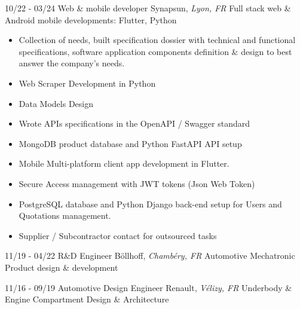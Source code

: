 \documentclass[]{friggeri-cv}
\begin{document}
\begin{entrylist}
  \entry
    {10/22 - 03/24}
    {Web \& mobile developer}
    {Synapsun, \textit{Lyon, FR}}
    {Full stack web \& Android mobile developments: \hspace*{8mm}Flutter, Python}
\end{entrylist}
\vspace{-15pt}

\vspace{0.5mm}
\begin{itemize}
\setlength{\itemsep}{1pt}
\setlength{\parskip}{0pt}
\setlength{\parsep}{0pt}

\item Collection of needs, built specification dossier with technical and functional specifications, software application components definition \& design to best answer the company's needs.
\item Web Scraper Development in Python
\item Data Models Design
\item Wrote APIs specifications in the OpenAPI / Swagger standard
\item MongoDB product database and Python FastAPI API setup
\item Mobile Multi-platform client app development in Flutter.
\item Secure Access management with JWT tokens (Json Web Token)
\item PostgreSQL database and Python Django back-end setup for Users and Quotations management.
\item Supplier / Subcontractor contact for outsourced tasks
\end{itemize}

\begin{entrylist}
  \entry
    {11/19 - 04/22}
    {R\&D Engineer}
    {Böllhoff, \textit{Chambéry, FR}}
    {Automotive Mechatronic Product design \& development}
\end{entrylist}
\vspace{0.5mm}
\begin{entrylist}
  \entry
    {11/16 - 09/19}
    {Automotive Design Engineer}
    {Renault, \textit{Vélizy, FR}}
    {Underbody \& Engine Compartment Design \& Architecture}
\end{entrylist}
\vspace*{-0.5cm}
\vspace*{0.45cm}
\end{document}

